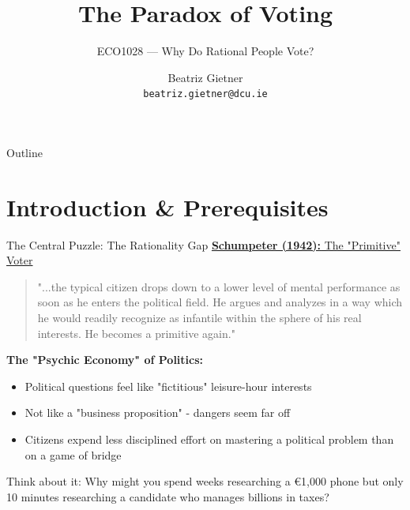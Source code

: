 \documentclass[10pt]{beamer}
\title{The Paradox of Voting}
\subtitle{ECO1028 --- Why Do Rational People Vote?}
\author{Beatriz Gietner\\
\texttt{beatriz.gietner@dcu.ie}}
\begin{document}
\maketitle

\begin{frame}{Outline}
\tableofcontents
\end{frame}

\section{Introduction \& Prerequisites}

\begin{frame}{The Central Puzzle: The Rationality Gap}
\href{https://www.jstor.org/stable/pdf/30023729.pdf}{\alert{\textbf{Schumpeter (1942):} The "Primitive" Voter}}


\begin{quote}
"...the typical citizen drops down to a lower level of mental performance as soon as he enters the political field. He argues and analyzes in a way which he would readily recognize as infantile within the sphere of his real interests. He becomes a primitive again."
\end{quote}


\textbf{The "Psychic Economy" of Politics:}
\begin{itemize}
\item Political questions feel like "fictitious" leisure-hour interests
\item Not like a "business proposition" - dangers seem far off
\item \alert{Citizens expend less disciplined effort on mastering a political problem than on a game of bridge}
\end{itemize}


\alert{Think about it:} Why might you spend weeks researching a €1,000 phone but only 10 minutes researching a candidate who manages billions in taxes?
\end{frame}
\end{document}
